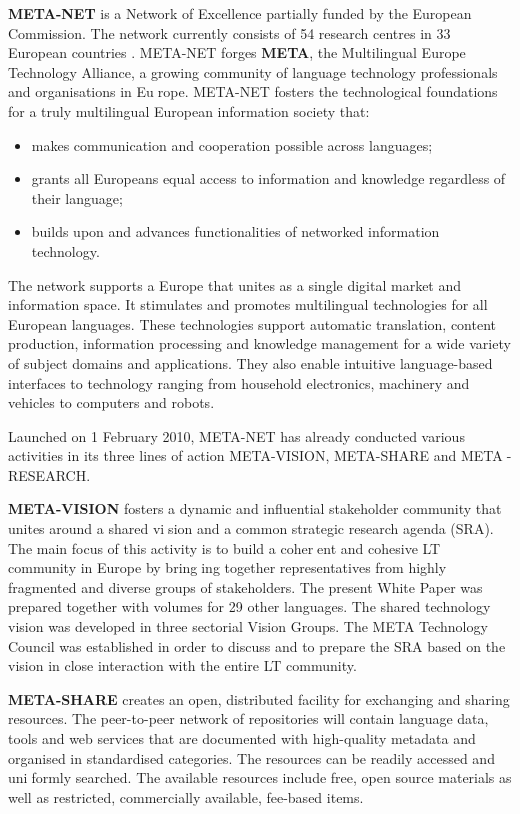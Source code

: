   \begin{multicols}{2}
\textbf{META-NET} is a Network of Excellence partially funded by the European Commission. The network currently consists of 54 research centres in 33 European countries \cite{rehm2011}. META-NET forges \textbf{META}, the Multilingual Europe Technology Alliance, a growing community of language technology professionals and organisations in Europe. META-NET fosters the technological foundations for a truly multilingual European information society that:

  \begin{itemize}
  \item makes communication and cooperation possible across languages;
\item grants all Europeans equal access to information and knowledge regardless of their language; 
\item builds upon and advances functionalities of networked information technology.
  \end{itemize}

The network supports a Europe that unites as a single digital market and information space. It stimulates and promotes multilingual technologies for all European languages. These technologies support automatic translation, content production, information processing and knowledge management for a wide variety of subject domains and applications. They also enable intuitive language-based interfaces to technology ranging from household electronics, machinery and vehicles to computers and robots.

Launched on 1 February 2010, META-NET has already conducted various activities in its three lines of action META-VISION, META-SHARE and META-RESEARCH. 

\textbf{META-VISION} fosters a dynamic and inﬂuential stakeholder community that unites around a shared vision and a common strategic research agenda (SRA). The main focus of this activity is to build a coherent and cohesive LT community in Europe by bringing together representatives from highly fragmented and diverse groups of stakeholders. The present White Paper was prepared together with volumes for 29 other languages. The shared technology vision was developed in three sectorial Vision Groups. The META Technology Council was established in order to discuss and to prepare the SRA based on the vision in close interaction with the entire LT community.

\textbf{META-SHARE} creates an open, distributed facility for exchanging and sharing resources. The peer-to-peer network of repositories will contain language data, tools and web services that are documented with high-quality metadata and organised in standardised categories. The resources can be readily accessed and uniformly searched. The available resources include free, open source materials as well as restricted, commercially available, fee-based items. 


\end{multicols}
